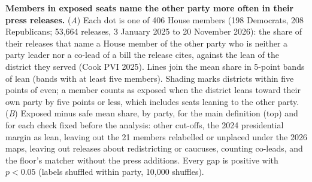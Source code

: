 
\caption{\textbf{Members in exposed seats name the other party more often in their press releases.} (\emph{A}) Each dot is one of 406 House members (198 Democrats, 208 Republicans; 53,664 releases, 3 January 2025 to 20 November 2026): the share of their releases that name a House member of the other party who is neither a party leader nor a co-lead of a bill the release cites, against the lean of the district they served (Cook PVI 2025). Lines join the mean share in 5-point bands of lean (bands with at least five members). Shading marks districts within five points of even; a member counts as exposed when the district leans toward their own party by five points or less, which includes seats leaning to the other party. (\emph{B}) Exposed minus safe mean share, by party, for the main definition (top) and for each check fixed before the analysis: other cut-offs, the 2024 presidential margin as lean, leaving out the 21 members relabelled or unplaced under the 2026 maps, leaving out releases about redistricting or caucuses, counting co-leads, and the floor's matcher without the press additions. Every gap is positive with $p < 0.05$ (labels shuffled within party, 10,000 shuffles).}
